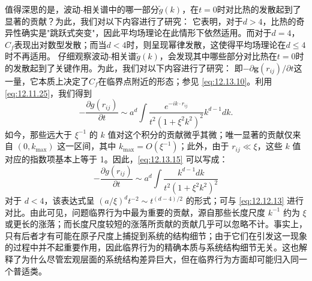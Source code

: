 值得深思的是，波动-相关谱中的哪一部分\(\tilde{g}(k)\)，在\(t=0\)时对比热的发散起到了显著的贡献？为此，我们对以下内容进行了研究：
它表明，对于\(d > 4\)，比热的奇异性确实是"跳跃式突变"，因此平均场理论在此情形下依然适用。而对于\(d = 4\)，\(C_f\)表现出对数型发散；而当\(d < 4\)时，则呈现幂律发散，这使得平均场理论在\(d \leq 4\)时不再适用。
仔细观察波动-相关谱\(\tilde{g}(k)\)，会发现其中哪些部分对比热在\(t=0\)时的发散起到了关键作用。为此，我们对以下内容进行了研究：
即\(-\partial\mathbf{g}(r_{ij})/\partial t\)这一量，它本质上决定了\(C_f\)在临界点附近的形态；参见 \autoref{eq:12.13.10}。利用 \autoref{eq:12.11.25}，我们得到
\begin{equation}\tag{12.13.15}\label{eq:12.13.15}
- \frac { \partial g ( r _ { i j } ) } { \partial t } \sim a ^{d} \int \frac { e ^{- i k \cdot r _ { i j} } } { t ^{2} ( 1 + \xi ^{2} k ^{2} ) ^{2} } k ^{d - 1} d k .
\end{equation}
如今，那些远大于 \(\xi^{-1}\) 的 \(k\) 值对这个积分的贡献微乎其微；唯一显著的贡献仅来自 \((0, k_{\max})\) 这一区间，其中 \(k_{\max} = O(\xi^{-1})\)；此外，由于 \(r_{ij} \ll \xi\)，这些 \(k\) 值对应的指数项基本上等于 1。因此，\autoref{eq:12.13.15} 可以写成：
\begin{equation}\tag{12.13.16}\label{eq:12.13.16}
- \frac { \partial g ( r _ { i j } ) } { \partial t } \sim a ^{d} \int \frac { k ^{d - 1} d k } { t ^{2} ( 1 + \xi ^{2} k ^{2} ) ^{2} }
\end{equation}
对于 \(d < 4\)，该表达式呈 \((a/\xi)^d t^{-2} \sim t^{(d-4)/2}\) 的形式；可与 \autoref{eq:12.12.13} 进行对比。由此可见，问题临界行为中最为重要的贡献，源自那些长度尺度 \(k^{-1}\) 约为 \(\xi\) 或更长的涨落；而长度尺度较短的涨落所贡献的贡献几乎可以忽略不计。事实上，只有后者才有可能在原子尺度上捕捉到系统的结构细节；由于它们在引发这一现象的过程中并不起重要作用，因此临界行为的精确本质与系统结构细节无关。这也解释了为什么尽管宏观层面的系统结构差异巨大，但在临界行为方面却可能归入同一个普适类。
